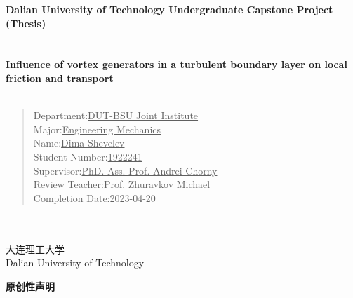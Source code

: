 \documentclass[12pt, a4paper]{article}
\begin{document}
	\begin{titlepage}
		\begin{center}
			\LARGE\textbf{Dalian University of Technology Undergraduate Capstone Project (Thesis)}
			~~~
			\\
			~~~
			\\
			~~~
			\\
			\Large\textbf{Influence of vortex generators in a turbulent boundary layer on local friction and transport}
			~~~
			\\
			~~~
			\\
			\begin{verse}
				\large{Department:\hspace{40pt}\underline{\hspace{1cm}DUT-BSU Joint Institute\hspace{22pt}}\\        
				Major:\hspace{81pt}\underline{\hspace{1cm}Engineering Mechanics\hspace{41pt}}\\  
				Name:\hspace{83pt}\underline{\hspace{1cm}Dima Shevelev\hspace{97pt}}\\                    
				Student Number:\hspace{8pt}\underline{\hspace{1cm}1922241\hspace{143pt}}\\                
				Supervisor:\hspace{50pt}\underline{\hspace{1cm}PhD. Ass. Prof. Andrei Chorny\hspace{69pt}}\\           
				Review Teacher:\hspace{14pt}\underline{\hspace{1cm}Prof. Zhuravkov Michael\hspace{69pt}}\\            
				Completion Date:\hspace{4pt}\underline{\hspace{1cm}2023-04-20\hspace{126pt}}}\\  
			\end{verse}
			~~~
			\\
			~~~
			\\
			\Large{大连理工大学}
			~~~
			\\
			Dalian University of Technology
		\end{center}  
	\end{titlepage}
	\newpage
	\pagestyle{fancy}
	\fancyfoot[C]{-\thepage-}
	\begin{center}
		\LARGE\textbf{原创性声明}
	\end{center}
\end{document}
